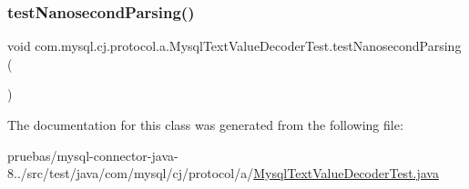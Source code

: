 \mbox{\label{classcom_1_1mysql_1_1cj_1_1protocol_1_1a_1_1_mysql_text_value_decoder_test_a7df8b20eb57045aee4e632d53302fe6a}} 
\subsubsection{\texorpdfstring{test\+Nanosecond\+Parsing()}{testNanosecondParsing()}}
{\footnotesize\ttfamily void com.\+mysql.\+cj.\+protocol.\+a.\+Mysql\+Text\+Value\+Decoder\+Test.\+test\+Nanosecond\+Parsing (\begin{DoxyParamCaption}{ }\end{DoxyParamCaption})}



The documentation for this class was generated from the following file\+:\begin{DoxyCompactItemize}
\item 
pruebas/mysql-\/connector-\/java-\/8../src/test/java/com/mysql/cj/protocol/a/\mbox{\hyperlink{_mysql_text_value_decoder_test_8java}{Mysql\+Text\+Value\+Decoder\+Test.\+java}}\end{DoxyCompactItemize}
